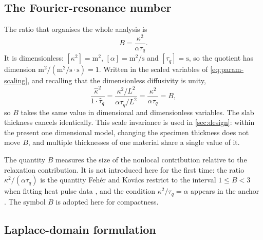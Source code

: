 \documentclass[preprint,12pt,a4paper]{elsarticle}
\theoremstyle{plain}
\theoremstyle{definition}
\theoremstyle{remark}
\newcommand{\tq}{\tau_{q}}
\newcommand{\kk}{\kappa^{2}}
\newcommand{\Bnum}{B}
\begin{document}
\subsection{The Fourier-resonance number}
\label{sec:model-B}

The ratio that organises the whole analysis is
%
\begin{equation}
  \Bnum = \frac{\kk}{\alpha \tq} .
  \label{eq:Bdef}
\end{equation}
%
It is dimensionless: $[\kk] = \si{\metre\squared}$,
$[\alpha] = \si{\metre\squared\per\second}$ and $[\tq] = \si{\second}$, so the
quotient has dimension $\si{\metre\squared}/(\si{\metre\squared\per\second}
\cdot \si{\second}) = 1$. Written in the scaled variables of
\eqref{eq:param-scaling}, and recalling that the dimensionless diffusivity is
unity,
%
\begin{equation}
  \frac{\hat{\kappa}^{2}}{1 \cdot \hat{\tau}_{q}}
  = \frac{\kk/L^{2}}{\alpha \tq/L^{2}}
  = \frac{\kk}{\alpha \tq}
  = \Bnum ,
  \label{eq:B-invariance}
\end{equation}
%
so $\Bnum$ takes the same value in dimensional and dimensionless variables.
The slab thickness cancels identically. This scale invariance is used in
\cref{sec:design}: within the present one dimensional model, changing the
specimen thickness does not move $\Bnum$, and multiple thicknesses of one
material share a single value of it.

The quantity $\Bnum$ measures the size of the nonlocal contribution relative to
the relaxation contribution. It is not introduced here for the first time: the
ratio $\kk/(\alpha\tq)$ is the quantity Feh\'er and Kov\'acs restrict to the
interval $1 \leq \Bnum < 3$ when fitting heat pulse data
\cite{FeherKovacs2021}, and the condition $\kk/\tq = \alpha$ appears in the
anchor \cite{Kovacs2018}. The symbol $\Bnum$ is adopted here for compactness.

\subsection{Laplace-domain formulation}
\label{sec:model-laplace}
\end{document}
